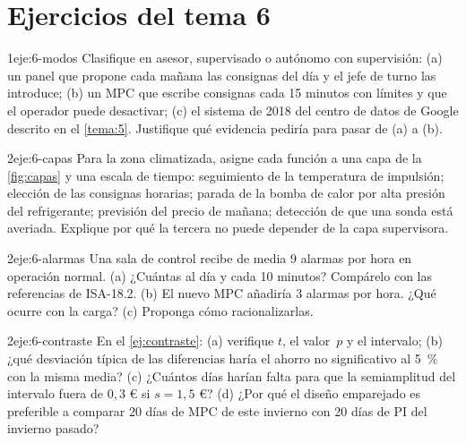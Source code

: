\section*{Ejercicios del tema 6}

\begin{ejercicio}{1}{eje:6-modos}
Clasifique en asesor, supervisado o autónomo con supervisión: (a) un panel que propone cada mañana las consignas del día y el jefe de turno las introduce; (b) un MPC que escribe consignas cada 15 minutos con límites y que el operador puede desactivar; (c) el sistema de 2018 del centro de datos de Google descrito en el \cref{tema:5}. Justifique qué evidencia pediría para pasar de (a) a (b).
\end{ejercicio}

\begin{ejercicio}{2}{eje:6-capas}
Para la zona climatizada, asigne cada función a una capa de la \cref{fig:capas} y una escala de tiempo: seguimiento de la temperatura de impulsión; elección de las consignas horarias; parada de la bomba de calor por alta presión del refrigerante; previsión del precio de mañana; detección de que una sonda está averiada. Explique por qué la tercera no puede depender de la capa supervisora.
\end{ejercicio}

\begin{ejercicio}{2}{eje:6-alarmas}
Una sala de control recibe de media 9 alarmas por hora en operación normal. (a) ¿Cuántas al día y cada 10 minutos? Compárelo con las referencias de ISA-18.2. (b) El nuevo MPC añadiría 3 alarmas por hora. ¿Qué ocurre con la carga? (c) Proponga cómo racionalizarlas.
\end{ejercicio}

\begin{ejercicio}{2}{eje:6-contraste}
En el \cref{ej:contraste}: (a) verifique $t$, el valor~$p$ y el intervalo; (b) ¿qué desviación típica de las diferencias haría el ahorro no significativo al 5~\% con la misma media? (c) ¿Cuántos días harían falta para que la semiamplitud del intervalo fuera de $0{,}3$ € si $s=1{,}5$ €? (d) ¿Por qué el diseño emparejado es preferible a comparar 20 días de MPC de este invierno con 20 días de PI del invierno pasado?
\end{ejercicio}

